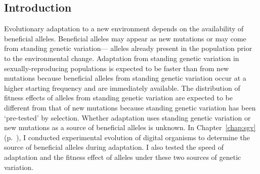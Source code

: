 \begin{doublespace}

\chapter*{Introduction}



Evolutionary adaptation to a new environment
depends on the availability of beneficial alleles.
%
Beneficial alleles may appear as new mutations
or may come from standing genetic variation---%
alleles already present in the population
prior to the environmental change.
%
Adaptation from standing genetic variation
in sexually-reproducing populations
is expected to be faster than from new mutations
because beneficial alleles from standing genetic variation
occur at a higher starting frequency and are immediately available.
%
The distribution of fitness effects of alleles
from standing genetic variation are expected to be different
from that of new mutations because standing genetic variation
has been `pre-tested' by selection.
%
Whether adaptation uses standing genetic variation
or new mutations as a source of beneficial alleles is unknown.
%
In Chapter~\ref{chap:sgv} (p.~\pageref{chap:sgv}),
I conducted experimental evolution of digital organisms
to determine the source of beneficial alleles during adaptation.
%
I also tested the speed of adaptation
and the fitness effect of alleles
under these two sources of genetic variation.




\end{doublespace}
